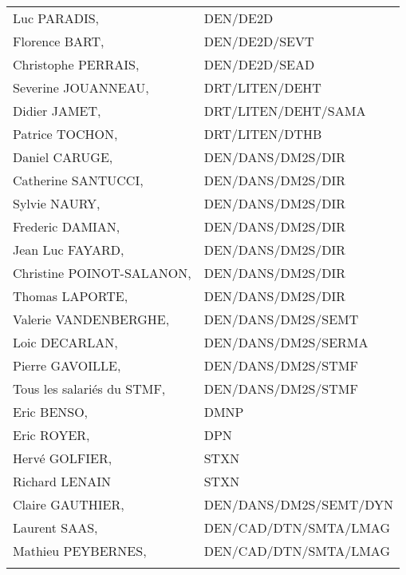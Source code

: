 {\begin{longtable}[!H]{p{6cm}p{10cm}}
   Luc PARADIS,                              & DEN/DE2D \\
   Florence BART,                            & DEN/DE2D/SEVT \\
   Christophe PERRAIS,                       & DEN/DE2D/SEAD \\
   Severine JOUANNEAU,                       & DRT/LITEN/DEHT \\
   Didier JAMET,                             & DRT/LITEN/DEHT/SAMA \\
   Patrice TOCHON,                           & DRT/LITEN/DTHB \\
   Daniel CARUGE,                            & DEN/DANS/DM2S/DIR\\
   Catherine SANTUCCI,                       & DEN/DANS/DM2S/DIR\\
   Sylvie NAURY,                             & DEN/DANS/DM2S/DIR\\
   Frederic DAMIAN,                          & DEN/DANS/DM2S/DIR\\
   Jean Luc FAYARD,                          & DEN/DANS/DM2S/DIR\\
   Christine POINOT-SALANON,                 & DEN/DANS/DM2S/DIR\\
   Thomas LAPORTE,                           & DEN/DANS/DM2S/DIR\\
   Valerie VANDENBERGHE,                     & DEN/DANS/DM2S/SEMT\\
   Loic DECARLAN,                            & DEN/DANS/DM2S/SERMA\\
   Pierre GAVOILLE,                          & DEN/DANS/DM2S/STMF\\
   Tous les salari\'es du STMF,              & DEN/DANS/DM2S/STMF \\
   Eric BENSO,                               & DMNP \\
   Eric ROYER,                               & DPN \\
   Herv\'e GOLFIER,                          & STXN \\
   Richard LENAIN                            & STXN \\
   Claire GAUTHIER,                          & DEN/DANS/DM2S/SEMT/DYN\\
   Laurent SAAS,                             & DEN/CAD/DTN/SMTA/LMAG\\
   Mathieu PEYBERNES,                        & DEN/CAD/DTN/SMTA/LMAG\\
\\
\end{longtable}
}


